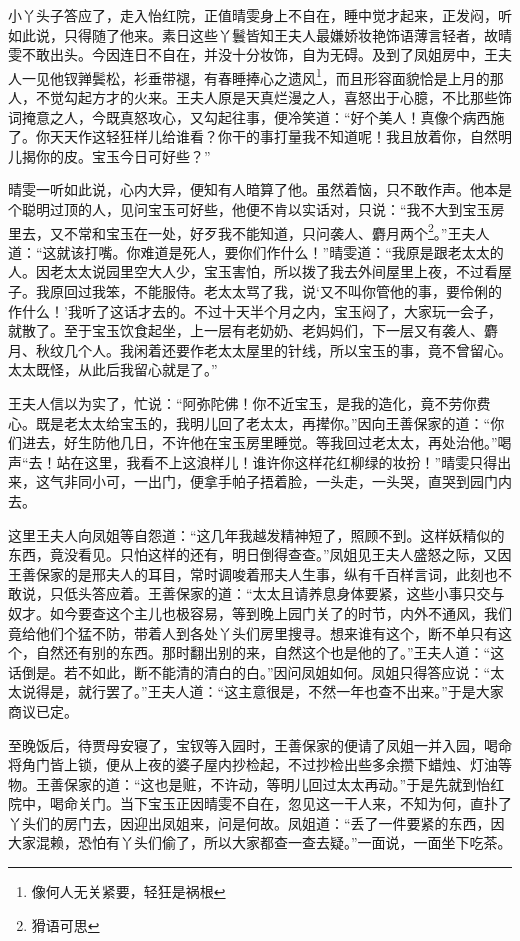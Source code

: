 \documentclass[12pt,oneside]{book}
\begin{document}
小丫头子答应了，走入怡红院，正值晴雯身上不自在，睡中觉才起来，正发闷，听如此说，只得随了他来。素日这些丫鬟皆知王夫人最嫌娇妆艳饰语薄言轻者，故晴雯不敢出头。今因连日不自在，并没十分妆饰，自为无碍。及到了凤姐房中，王夫人一见他钗亸鬓松，衫垂带褪，有春睡捧心之遗风\footnote{像何人无关紧要，轻狂是祸根}，而且形容面貌恰是上月的那人，不觉勾起方才的火来。王夫人原是天真烂漫之人，喜怒出于心臆，不比那些饰词掩意之人，今既真怒攻心，又勾起往事，便冷笑道：“好个美人！真像个病西施了。你天天作这轻狂样儿给谁看？你干的事打量我不知道呢！我且放着你，自然明儿揭你的皮。宝玉今日可好些？”

晴雯一听如此说，心内大异，便知有人暗算了他。虽然着恼，只不敢作声。他本是个聪明过顶的人，见问宝玉可好些，他便不肯以实话对，只说：“我不大到宝玉房里去，又不常和宝玉在一处，好歹我不能知道，只问袭人、麝月两个\footnote{猾语可思}。”王夫人道：“这就该打嘴。你难道是死人，要你们作什么！”晴雯道：“我原是跟老太太的人。因老太太说园里空大人少，宝玉害怕，所以拨了我去外间屋里上夜，不过看屋子。我原回过我笨，不能服侍。老太太骂了我，说‘又不叫你管他的事，要伶俐的作什么！’我听了这话才去的。不过十天半个月之内，宝玉闷了，大家玩一会子，就散了。至于宝玉饮食起坐，上一层有老奶奶、老妈妈们，下一层又有袭人、麝月、秋纹几个人。我闲着还要作老太太屋里的针线，所以宝玉的事，竟不曾留心。太太既怪，从此后我留心就是了。”

王夫人信以为实了，忙说：“阿弥陀佛！你不近宝玉，是我的造化，竟不劳你费心。既是老太太给宝玉的，我明儿回了老太太，再撵你。”因向王善保家的道：“你们进去，好生防他几日，不许他在宝玉房里睡觉。等我回过老太太，再处治他。”喝声“去！站在这里，我看不上这浪样儿！谁许你这样花红柳绿的妆扮！”晴雯只得出来，这气非同小可，一出门，便拿手帕子捂着脸，一头走，一头哭，直哭到园门内去。

这里王夫人向凤姐等自怨道：“这几年我越发精神短了，照顾不到。这样妖精似的东西，竟没看见。只怕这样的还有，明日倒得查查。”凤姐见王夫人盛怒之际，又因王善保家的是邢夫人的耳目，常时调唆着邢夫人生事，纵有千百样言词，此刻也不敢说，只低头答应着。王善保家的道：“太太且请养息身体要紧，这些小事只交与奴才。如今要查这个主儿也极容易，等到晚上园门关了的时节，内外不通风，我们竟给他们个猛不防，带着人到各处丫头们房里搜寻。想来谁有这个，断不单只有这个，自然还有别的东西。那时翻出别的来，自然这个也是他的了。”王夫人道：“这话倒是。若不如此，断不能清的清白的白。”因问凤姐如何。凤姐只得答应说：“太太说得是，就行罢了。”王夫人道：“这主意很是，不然一年也查不出来。”于是大家商议已定。

至晚饭后，待贾母安寝了，宝钗等入园时，王善保家的便请了凤姐一并入园，喝命将角门皆上锁，便从上夜的婆子屋内抄检起，不过抄检出些多余攒下蜡烛、灯油等物。王善保家的道：“这也是赃，不许动，等明儿回过太太再动。”于是先就到怡红院中，喝命关门。当下宝玉正因晴雯不自在，忽见这一干人来，不知为何，直扑了丫头们的房门去，因迎出凤姐来，问是何故。凤姐道：“丢了一件要紧的东西，因大家混赖，恐怕有丫头们偷了，所以大家都查一查去疑。”一面说，一面坐下吃茶。
\end{document}
